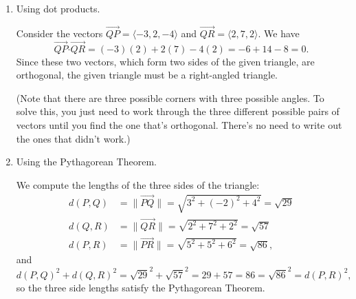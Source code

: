 \documentclass[letterpaper,12pt]{amsart}
\newcommand{\len}[1]{\lVert #1\rVert}
\begin{document}
\begin{enumerate}
\medskip

\begin{enumerate}
 \item Using dot products.

\medskip

Consider the vectors $\overrightarrow{QP} = \langle -3,2,-4\rangle$ and $\overrightarrow{QR} = \langle 2, 7, 2\rangle$. We have
\[
 \overrightarrow{QP}\boldsymbol{\cdot}\overrightarrow{QR} = (-3)(2)+2(7)-4(2) = -6+14-8=0.
\]
Since these two vectors, which form two sides of the given triangle, are orthogonal, the given triangle must be a right-angled triangle.

(Note that there are three possible corners with three possible angles. To solve this, you just need to work through the three different possible pairs of vectors until you find the one that's orthogonal. There's no need to write out the ones that didn't work.)

 \item Using the Pythagorean Theorem.

\medskip

We compute the lengths of the three sides of the triangle:
\begin{align*}
 d(P,Q) & = \len{\overrightarrow{PQ}} = \sqrt{3^2+(-2)^2+4^2} = \sqrt{29}\\
 d(Q,R) & = \len{\overrightarrow{QR}} = \sqrt{2^2+7^2+2^2} = \sqrt{57}\\
 d(P,R) & = \len{\overrightarrow{PR}} = \sqrt{5^2+5^2+6^2} = \sqrt{86},
\end{align*}
and
\[
 d(P,Q)^2+d(Q,R)^2 = \sqrt{29}^2+\sqrt{57}^2 = 29+57=86=\sqrt{86}^2 = d(P,R)^2,
\]
so the three side lengths satisfy the Pythagorean Theorem.

\end{enumerate}
\end{enumerate}
\end{document}
